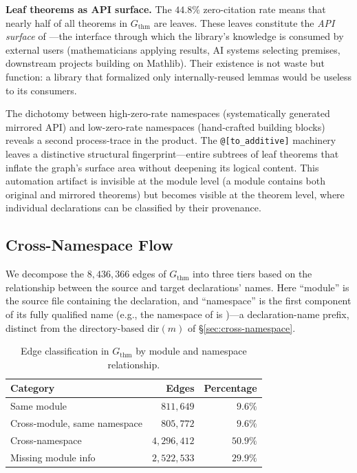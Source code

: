 \noindent\textbf{Leaf theorems as API surface.}
\label{rem:leaf-theorems}
The $44.8\%$ zero-citation rate means that nearly half of all theorems in $G_{\mathrm{thm}}$ are leaves. These leaves constitute the \emph{API surface} of ---the interface through which the library's knowledge is consumed by external users (mathematicians applying results, AI systems selecting premises, downstream projects building on Mathlib). Their existence is not waste but function: a library that formalized only internally-reused lemmas would be useless to its consumers.

The dichotomy between high-zero-rate namespaces (systematically generated mirrored API) and low-zero-rate namespaces (hand-crafted building blocks) reveals a second process-trace in the product. The \texttt{@[to\_additive]} machinery leaves a distinctive structural fingerprint---entire subtrees of leaf theorems that inflate the graph's surface area without deepening its logical content. This automation artifact is invisible at the module level (a module contains both original and mirrored theorems) but becomes visible at the theorem level, where individual declarations can be classified by their provenance.

\subsection{Cross-Namespace Flow}
\label{sec:thm-cross-namespace}

We decompose the $8{,}436{,}366$ edges of $G_{\mathrm{thm}}$ into three tiers based on the relationship between the source and target declarations' names. Here ``module'' is the source file containing the declaration, and ``namespace'' is the first component of its fully qualified name (e.g., the namespace of  is )---a declaration-name prefix, distinct from the directory-based $\mathrm{dir}(m)$ of \S\ref{sec:cross-namespace}.

\begin{table}[ht]
\centering
\caption{Edge classification in $G_{\mathrm{thm}}$ by module and namespace relationship.}
\label{tab:thm-edge-breakdown}
\begin{tabular}{lrr}
\toprule
Category & Edges & Percentage \\
\midrule
Same module                    & $811{,}649$   & $9.6\%$ \\
Cross-module, same namespace   & $805{,}772$   & $9.6\%$ \\
Cross-namespace                & $4{,}296{,}412$ & $50.9\%$ \\
Missing module info            & $2{,}522{,}533$ & $29.9\%$ \\
\bottomrule
\end{tabular}
\end{table}

